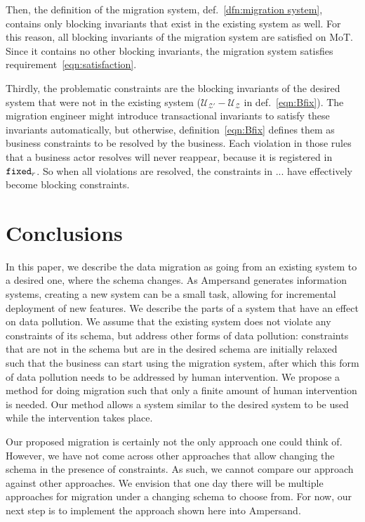 \documentclass[runningheads]{llncs}
\newcommand{\rules}{\mathcal{U}}
\newcommand{\schema}{\mathscr{Z}}
\begin{document}
   Then, the definition of the migration system, def.~\ref{dfn:migration system}, contains only blocking invariants that exist in the existing system as well.
   For this reason, all blocking invariants of the migration system are satisfied on MoT.
   Since it contains no other blocking invariants, the migration system satisfies requirement~\ref{eqn:satisfaction}.

   Thirdly, the problematic constraints are the blocking invariants of the desired system that were not in the existing system ($\rules_{\schema'}-\rules_{\schema}$ in def.~\ref{eqn:Bfix}).
   The migration engineer might introduce transactional invariants to satisfy these invariants automatically,
   but otherwise, definition~\ref{eqn:Bfix} defines them as business constraints to be resolved by the business.
   Each violation in those rules that a business actor resolves will never reappear,
   because it is registered in ${\tt fixed}_r$.
   So when all violations are resolved, the constraints in ... have effectively become blocking constraints.
\section{Conclusions}
\label{sct:Conclusions}
   In this paper, we describe the data migration as going from an existing system to a desired one, where the schema changes.
   As Ampersand generates information systems, creating a new system can be a small task, allowing for incremental deployment of new features.
   We describe the parts of a system that have an effect on data pollution.
   We assume that the existing system does not violate any constraints of its schema, but address other forms of data pollution:
   constraints that are not in the schema but are in the desired schema are initially relaxed such that the business can start using the migration system, after which this form of data pollution needs to be addressed by human intervention.
   We propose a method for doing migration such that only a finite amount of human intervention is needed.
   Our method allows a system similar to the desired system to be used while the intervention takes place.

   Our proposed migration is certainly not the only approach one could think of.
   However, we have not come across other approaches that allow changing the schema in the presence of constraints.
   As such, we cannot compare our approach against other approaches.
   We envision that one day there will be multiple approaches for migration under a changing schema to choose from.
   For now, our next step is to implement the approach shown here into Ampersand.
\end{document}
